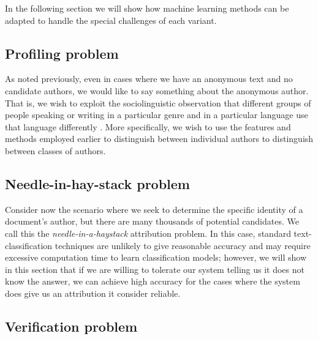 In the following section we will show how machine learning methods can be adapted to handle the special challenges of each variant.

\subsection{Profiling problem}
As noted previously, even in cases where we have an anonymous text and no candidate authors, we would like to say something about the anonymous author. That is, we wish to exploit the sociolinguistic observation that different groups of people speaking or writing in a particular genre and in a particular language use that language differently \cite{chambers2004handbook}. More specifically, we wish to use the features and methods employed earlier to distinguish between individual authors to distinguish between
classes of authors.

\subsection{Needle-in-hay-stack problem}

Consider now the scenario where we seek to determine the specific identity of a document’s author, but there are many thousands of potential candidates. We call this the \textit{needle-in-a-haystack} attribution problem. In this case, standard text-classification techniques are unlikely to give reasonable accuracy and may require excessive computation time to learn classification models; however, we will show in this section that if we are willing to tolerate our system telling us it does not know the answer, we can achieve high accuracy for the cases where the system does give us an attribution it consider reliable.

\subsection{Verification problem}
 
